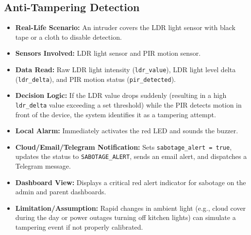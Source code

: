 \documentclass[11pt,a4paper]{report}
\begin{document}
\subsection{Anti-Tampering Detection}
\begin{itemize}
    \item \textbf{Real-Life Scenario:} An intruder covers the LDR light sensor with black tape or a cloth to disable detection.
    \item \textbf{Sensors Involved:} LDR light sensor and PIR motion sensor.
    \item \textbf{Data Read:} Raw LDR light intensity (\texttt{ldr\_value}), LDR light level delta (\texttt{ldr\_delta}), and PIR motion status (\texttt{pir\_detected}).
    \item \textbf{Decision Logic:} If the LDR value drops suddenly (resulting in a high \texttt{ldr\_delta} value exceeding a set threshold) while the PIR detects motion in front of the device, the system identifies it as a tampering attempt.
    \item \textbf{Local Alarm:} Immediately activates the red LED and sounds the buzzer.
    \item \textbf{Cloud/Email/Telegram Notification:} Sets \texttt{sabotage\_alert = true}, updates the status to \texttt{SABOTAGE\_ALERT}, sends an email alert, and dispatches a Telegram message.
    \item \textbf{Dashboard View:} Displays a critical red alert indicator for sabotage on the admin and parent dashboards.
    \item \textbf{Limitation/Assumption:} Rapid changes in ambient light (e.g., cloud cover during the day or power outages turning off kitchen lights) can simulate a tampering event if not properly calibrated.
\end{itemize}
\end{document}
